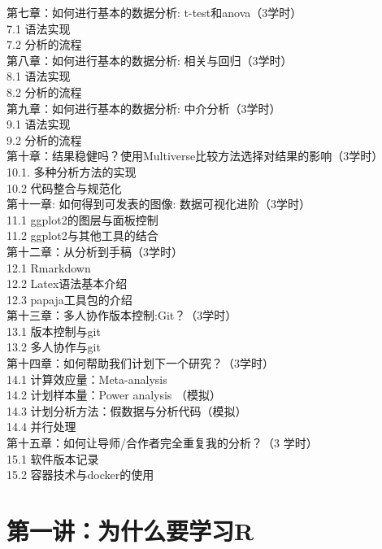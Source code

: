 \documentclass[
  oneside]{book}
\begin{document}
第七章：如何进行基本的数据分析: t-test和anova（3学时）\\
7.1 语法实现\\
7.2 分析的流程\\

第八章：如何进行基本的数据分析: 相关与回归（3学时）\\
8.1 语法实现\\
8.2 分析的流程\\

第九章：如何进行基本的数据分析: 中介分析（3学时）\\
9.1 语法实现\\
9.2 分析的流程\\

第十章：结果稳健吗？使用Multiverse比较方法选择对结果的影响（3学时）\\
10.1. 多种分析方法的实现\\
10.2 代码整合与规范化\\

第十一章: 如何得到可发表的图像: 数据可视化进阶（3学时）\\
11.1 ggplot2的图层与面板控制\\
11.2 ggplot2与其他工具的结合\\

第十二章：从分析到手稿（3学时）\\
12.1 Rmarkdown\\
12.2 Latex语法基本介绍\\
12.3 papaja工具包的介绍\\

第十三章：多人协作版本控制:Git？（3学时）\\
13.1 版本控制与git\\
13.2 多人协作与git~\\

第十四章：如何帮助我们计划下一个研究？（3学时）\\
14.1 计算效应量：Meta-analysis\\
14.2 计划样本量：Power analysis （模拟）\\
14.3 计划分析方法：假数据与分析代码（模拟）\\
14.4 并行处理\\

第十五章：如何让导师/合作者完全重复我的分析？（3 学时）\\
15.1 软件版本记录\\
15.2 容器技术与docker的使用\\

\hypertarget{lesson-1}{%
\chapter{第一讲：为什么要学习R}\label{lesson-1}}
\end{document}
